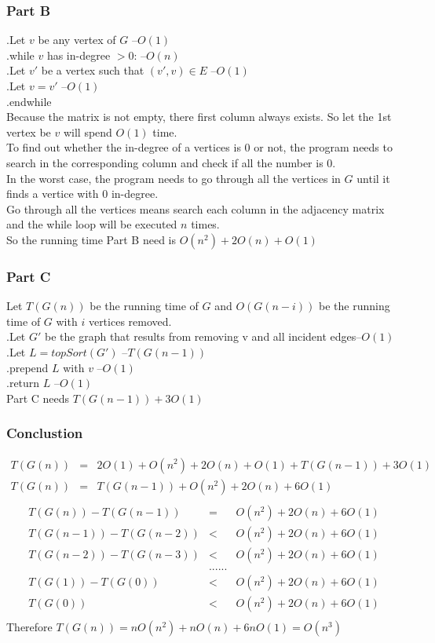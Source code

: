 \documentclass{article} %
\begin{document}
\subsubsection*{Part B}
.\quad Let $v$ be any vertex of $G$ \quad--$O(1)$\\
.\quad while $v$ has in-degree $> 0$: \quad--$O(n)$\\
.\quad\quad Let $v'$ be a vertex such that $(v', v) \in E$ \quad--$O(1)$\\
.\quad\quad Let $v = v'$ \quad--$O(1)$\\
.\quad endwhile\\
Because the matrix is not empty, there first column always exists. So let the 1st vertex be $v$ will spend $O(1)$ time.\\
To find out whether the in-degree of a vertices is 0 or not, the program needs to search in the corresponding column and check if all the number is 0.\\
In the worst case, the program needs to go through all the vertices in $G$ until it finds a vertice with 0 in-degree.\\ 
Go through all the vertices means search each column in the adjacency matrix and the while loop will be executed $n$ times.\\
So the running time Part B need is $O(n^2)+2O(n)+O(1)$
\subsubsection*{Part C}
Let $T(G(n))$ be the running time of $G$ and $O(G(n-i))$ be the running time of $G$ with $i$ vertices removed.\\
.\quad Let $G'$ be the graph that results from removing v and all incident edges\quad--$O(1)$\\
.\quad Let $L = topSort(G')$ \quad--$T(G(n-1))$\\
.\quad prepend $L$ with $v$ \quad--$O(1)$\\
.\quad return $L$ \quad--$O(1)$\\
Part C needs $T(G(n-1))+3O(1)$\\
\subsubsection*{Conclustion}
\[\begin{array}{rll}
    T(G(n)) &=&2O(1)+O(n^2)+2O(n)+O(1) +T(G(n-1)) +3O(1)\\
    T(G(n)) &=&T(G(n-1)) +O(n^2)+2O(n)+6O(1)\\
\end{array}\]
\[\begin{array}{rll}
    T(G(n))-T(G(n-1))   &=& O(n^2)+2O(n)+6O(1)\\
    T(G(n-1))-T(G(n-2)) &<& O(n^2)+2O(n)+6O(1)\\
    T(G(n-2))-T(G(n-3)) &<& O(n^2)+2O(n)+6O(1)\\
                    &......&\\
    T(G(1)) - T(G(0))   &<&  O(n^2) +2O(n) +6O(1)\\
    T(G(0))             &<& O(n^2) +2O(n) +6O(1)\\
\end{array}\]
Therefore $T(G(n)) = nO(n^2) + nO(n)+6nO(1) = O(n^3)$
\end{document}

